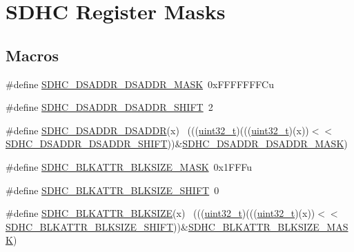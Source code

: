 \hypertarget{group___s_d_h_c___register___masks}{}\section{S\+D\+HC Register Masks}
\label{group___s_d_h_c___register___masks}
\subsection*{Macros}
\begin{DoxyCompactItemize}
\item 
\#define \hyperlink{group___s_d_h_c___register___masks_ga0879039aa6d312f63642daf292ea07e1}{S\+D\+H\+C\+\_\+\+D\+S\+A\+D\+D\+R\+\_\+\+D\+S\+A\+D\+D\+R\+\_\+\+M\+A\+SK}~0x\+F\+F\+F\+F\+F\+F\+F\+Cu
\item 
\#define \hyperlink{group___s_d_h_c___register___masks_gaab7280ffe17d17dc4e36a58270c97edb}{S\+D\+H\+C\+\_\+\+D\+S\+A\+D\+D\+R\+\_\+\+D\+S\+A\+D\+D\+R\+\_\+\+S\+H\+I\+FT}~2
\item 
\#define \hyperlink{group___s_d_h_c___register___masks_gabf3237816737e9f61afc592a4262c3c3}{S\+D\+H\+C\+\_\+\+D\+S\+A\+D\+D\+R\+\_\+\+D\+S\+A\+D\+DR}(x)                                    ~(((\hyperlink{_p_e___types_8h_a33594304e786b158f3fb30289278f5af}{uint32\+\_\+t})(((\hyperlink{_p_e___types_8h_a33594304e786b158f3fb30289278f5af}{uint32\+\_\+t})(x))$<$$<$\hyperlink{group___s_d_h_c___register___masks_gaab7280ffe17d17dc4e36a58270c97edb}{S\+D\+H\+C\+\_\+\+D\+S\+A\+D\+D\+R\+\_\+\+D\+S\+A\+D\+D\+R\+\_\+\+S\+H\+I\+FT}))\&\hyperlink{group___s_d_h_c___register___masks_ga0879039aa6d312f63642daf292ea07e1}{S\+D\+H\+C\+\_\+\+D\+S\+A\+D\+D\+R\+\_\+\+D\+S\+A\+D\+D\+R\+\_\+\+M\+A\+SK})
\item 
\#define \hyperlink{group___s_d_h_c___register___masks_ga15a1d67cd23b4eaae16cf10809520195}{S\+D\+H\+C\+\_\+\+B\+L\+K\+A\+T\+T\+R\+\_\+\+B\+L\+K\+S\+I\+Z\+E\+\_\+\+M\+A\+SK}~0x1\+F\+F\+Fu
\item 
\#define \hyperlink{group___s_d_h_c___register___masks_gab4dbeb59800b35d4f9e1d12f27a3f4d8}{S\+D\+H\+C\+\_\+\+B\+L\+K\+A\+T\+T\+R\+\_\+\+B\+L\+K\+S\+I\+Z\+E\+\_\+\+S\+H\+I\+FT}~0
\item 
\#define \hyperlink{group___s_d_h_c___register___masks_ga67a8ba2d8eeab8e9f8cc60a679d76fce}{S\+D\+H\+C\+\_\+\+B\+L\+K\+A\+T\+T\+R\+\_\+\+B\+L\+K\+S\+I\+ZE}(x)                                ~(((\hyperlink{_p_e___types_8h_a33594304e786b158f3fb30289278f5af}{uint32\+\_\+t})(((\hyperlink{_p_e___types_8h_a33594304e786b158f3fb30289278f5af}{uint32\+\_\+t})(x))$<$$<$\hyperlink{group___s_d_h_c___register___masks_gab4dbeb59800b35d4f9e1d12f27a3f4d8}{S\+D\+H\+C\+\_\+\+B\+L\+K\+A\+T\+T\+R\+\_\+\+B\+L\+K\+S\+I\+Z\+E\+\_\+\+S\+H\+I\+FT}))\&\hyperlink{group___s_d_h_c___register___masks_ga15a1d67cd23b4eaae16cf10809520195}{S\+D\+H\+C\+\_\+\+B\+L\+K\+A\+T\+T\+R\+\_\+\+B\+L\+K\+S\+I\+Z\+E\+\_\+\+M\+A\+SK})

\end{DoxyCompactItemize}
